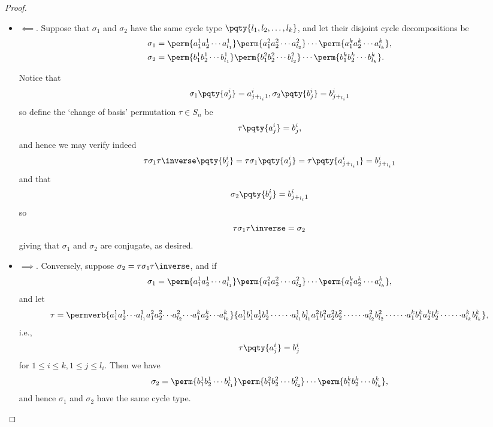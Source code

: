 \begin{proof}
    \begin{itemize}
        \item \(\impliedby\). Suppose that \(\sigma_1\) and \(\sigma_2\) have the same cycle type \(\pqty{l_1, l_2, \ldots, l_k}\), and let their disjoint cycle decompositions be
        \begin{align*}
            \sigma_1 &= \perm{{a_1^1} {a_2^1} \cdots {a_{l_1}^1}} \perm{{a_1^2} {a_2^2} \cdots {a_{l_2}^2}} \cdots \perm{{a_1^k} {a_2^k} \cdots {a_{l_k}^k}}, \\
            \sigma_2 &= \perm{{b_1^1} {b_2^1} \cdots {b_{l_1}^1}} \perm{{b_1^2} {b_2^2} \cdots {b_{l_2}^2}} \cdots \perm{{b_1^k} {b_2^k} \cdots {b_{l_k}^k}}.
        \end{align*}

        Notice that
        \[
            \sigma_1 \pqty{a_j^i} = a_{j +_{l_i} 1}^i, \sigma_2 \pqty{b_j^i} = b_{j +_{l_i} 1}^i
        \]
        so define the `change of basis' permutation \(\tau \in S_n\) be
        \[
            \tau \pqty{a_j^i} = b_j^i,
        \]
        and hence we may verify indeed
        \[
            \tau\sigma_1\tau\inverse \pqty{b_j^i} = \tau\sigma_1\pqty{a_j^i} = \tau\pqty{a_{j +_{l_i} 1}^{i}} = b_{j +_{l_i} 1}^i
        \]
        and that
        \[
            \sigma_2\pqty{b_j^i} = b_{j +_{l_i} 1}^i
        \]
        so
        \[
            \tau \sigma_1 \tau\inverse = \sigma_2
        \]
        giving that \(\sigma_1\) and \(\sigma_2\) are conjugate, as desired.

        \item \(\implies\). Conversely, suppose \(\sigma_2 = \tau \sigma_1 \tau\inverse\), and if
        \[
            \sigma_1 = \perm{{a_1^1} {a_2^1} \cdots {a_{l_1}^1}} \perm{{a_1^2} {a_2^2} \cdots {a_{l_2}^2}} \cdots \perm{{a_1^k} {a_2^k} \cdots {a_{l_k}^k}},
        \]
        and let
        \[
            \tau = \permverb{{a_1^1}{a_2^1}{\cdots}{a_{l_1}^1}{a_1^2}{a_2^2}{\cdots}{a_{l_2}^2}{\cdots}{a_1^k}{a_2^k}{\cdots}{a_{l_k}^k}}{
                {a_1^1}{b_1^1}
                {a_2^1}{b_2^1}
                \cdots{\cdots}
                {a_{l_1}^1}{b_{l_1}^1}
                {a_1^2}{b_1^2}
                {a_2^2}{b_2^2}
                \cdots{\cdots}
                {a_{l_2}^2}{b_{l_2}^2}
                \cdots{\cdots}
                {a_1^k}{b_1^k}
                {a_2^k}{b_2^k}
                \cdots{\cdots} 
                {a_{l_k}^k}{b_{l_k}^k}},
        \]
        i.e.,
        \[
            \tau\pqty{a_j^i} = b_j^i
        \]
        for \(1 \leq i \leq k, 1 \leq j \leq l_i\). Then we have
        \[
            \sigma_2 = \perm{{b_1^1} {b_2^1} \cdots {b_{l_1}^1}} \perm{{b_1^2} {b_2^2} \cdots {b_{l_2}^2}} \cdots \perm{{b_1^k} {b_2^k} \cdots {b_{l_k}^k}},
        \]
        and hence \(\sigma_1\) and \(\sigma_2\) have the same cycle type.
    \end{itemize}
\end{proof}

